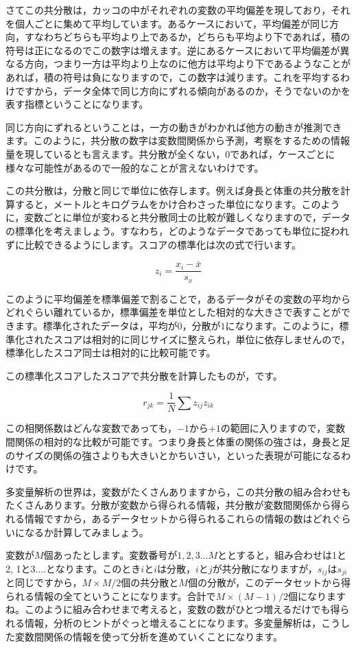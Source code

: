 \documentclass{ltjsbook}
\begin{document}
さてこの共分散は，カッコの中がそれぞれの変数の平均偏差を現しており，それを個人ごとに集めて平均しています。あるケースにおいて，平均偏差が同じ方向，すなわちどちらも平均より上であるか，どちらも平均より下であれば，積の符号は正になるのでこの数字は増えます。逆にあるケースにおいて平均偏差が異なる方向，つまり一方は平均より上なのに他方は平均より下であるようなことがあれば，積の符号は負になりますので，この数字は減ります。これを平均するわけですから，データ全体で同じ方向にずれる傾向があるのか，そうでないのかを表す指標ということになります。

同じ方向にずれるということは，一方の動きがわかれば他方の動きが推測できます。このように，共分散の数字は変数間関係から予測，考察をするための情報量を現しているとも言えます。共分散が全くない，0であれば，ケースごとに様々な可能性があるので一般的なことが言えないわけです。

この共分散は，分散と同じで単位に依存します。例えば身長と体重の共分散を計算すると，メートルとキログラムをかけ合わさった単位になります。このように，変数ごとに単位が変わると共分散同士の比較が難しくなりますので，データの標準化を考えましょう。すなわち，どのようなデータであっても単位に捉われずに比較できるようにします。スコアの標準化は次の式で行います。

\[ z_i = \frac{x_i - \bar{x}}{s_x} \]

このように平均偏差を標準偏差で割ることで，あるデータがその変数の平均からどれぐらい離れているか，標準偏差を単位とした相対的な大きさで表すことができます。標準化されたデータは，平均が$0$，分散が$1$になります。このように，標準化されたスコアは相対的に同じサイズに整えられ，単位に依存しませんので，標準化したスコア同士は相対的に比較可能です。

この標準化スコアしたスコアで共分散を計算したものが，です。

\[ r_{jk} = \frac{1}{N} \sum z_{ij} z_{ik} \]

この相関係数はどんな変数であっても，$-1$から$+1$の範囲に入りますので，変数間関係の相対的な比較が可能です。つまり身長と体重の関係の強さは，身長と足のサイズの関係の強さよりも大きいとかちいさい，といった表現が可能になるわけです。

多変量解析の世界は，変数がたくさんありますから，この共分散の組み合わせもたくさんあります。分散が変数から得られる情報，共分散が変数間関係から得られる情報ですから，あるデータセットから得られるこれらの情報の数はどれぐらいになるか計算してみましょう。

変数が$M$個あったとします。変数番号が$1,2,3...M$ととすると，組み合わせは1と2, 1と3....となります。このとき$i$と$i$は分散，$i$と$j$が共分散になりますが，$s_{ij}$は$s_{ji}$と同じですから，$M \times M /2$個の共分散と$M$個の分散が，このデータセットから得られる情報の全てということになります。合計で$M \times (M-1) /2 $個になりますね。このように組み合わせまで考えると，変数の数がひとつ増えるだけでも得られる情報，分析のヒントがぐっと増えることになります。多変量解析は，こうした変数間関係の情報を使って分析を進めていくことになります。
\end{document}
